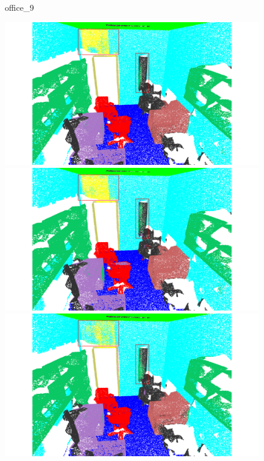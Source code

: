 \begin{figure}[htbp]
    \centering

    \begin{minipage}{0.09\textwidth}
        \centering
        office\_9
    \end{minipage}
    \hfill
    \begin{minipage}{0.17\textwidth}
        \centering
        \includegraphics[width=\textwidth]{fig/supplement/semantic_segmentation/office_9/DAPT_office_9.pdf}
    \end{minipage}
    \hfill
    \begin{minipage}{0.17\textwidth}
        \centering
        \includegraphics[width=\textwidth]{fig/supplement/semantic_segmentation/office_9/IDPT_office_9.pdf} %
    \end{minipage}
    \hfill
    \begin{minipage}{0.17\textwidth}
        \centering
        \includegraphics[width=\textwidth]{fig/supplement/semantic_segmentation/office_9/PointGST_office_9.pdf}

\end{minipage}
\end{figure}
